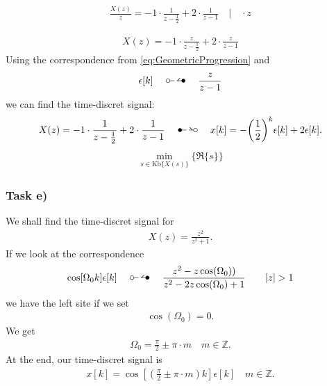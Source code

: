 \begin{align}
	\frac{X(z)}{z}=-1\cdot\frac{1}{z-\frac{1}{2}}+2\cdot\frac{1}{z-1} \quad\Bigg | \quad \cdot z
\end{align}

\begin{align}
	X(z)=-1\cdot\frac{z}{z-\frac{1}{2}}+2\cdot\frac{z}{z-1}
\end{align}
Using the correspondence from \ref{eq:GeometricProgression} and 
\begin{align}
	\epsilon[k]\quad\ztransf\quad\frac{z}{z-1}
\end{align}
we can find the time-discret signal:
\begin{align}
	X(z)=-1\cdot\frac{1}{z-\frac{1}{2}}+2\cdot\frac{1}{z-1}\quad\Ztransf\quad x[k]=-\bigg(\frac{1}{2}\bigg)^k\epsilon[k]+2\epsilon[k].
\end{align}
\begin{align}
	\underset{s \in \mathrm{Kb} \{ X(s) \} }{\min}\big \{ \Re \{ s \} \big \}
\end{align}
\subsubsection{Task e)}
We shall find the time-discret signal for
\begin{align}
	X(z)=\frac{z^2}{z^2+1}.
\end{align}
If we look at the correspondence 
\begin{align}
	\cos [\Omega_0k]\epsilon[k]\quad\ztransf\quad \frac{z^2-z\cos(\Omega_0))}{z^2-2z\cos(\Omega_0)+1}\quad\quad |z| > 1
\end{align}
we have the left site if we set
\begin{align}
	\cos(\Omega_0)=0.
\end{align}
We get
\begin{align}
	\Omega_0 = \frac{\pi}{2} \pm \pi \cdot m \quad m \in \mathbb{Z}.
\end{align}
At the end, our time-discret signal is
\begin{align}
	x[k]=\cos[(\frac{\pi}{2}\pm \pi\cdot m)k]\epsilon[k]\quad m \in \mathbb{Z}.
\end{align}
